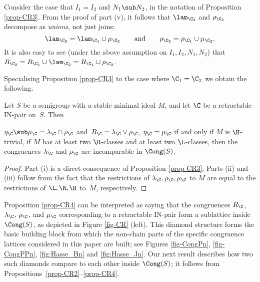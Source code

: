 \begin{rem}\label{rem:nonprincipal}
Consider the case that $I_1=I_2$ and $N_1\sub N_2$, in the notation of Proposition \ref{prop-CR3}.  From the proof of part (v), it follows that $\lam_{\C_2}$ and $\rho_{\C_2}$ decompose as \emph{unions}, not just joins:
\[
\lam_{\C_2} = \lam_{\C_1}\cup\mu_{\C_2} \qquad\text{and}\qquad \rho_{\C_2} = \rho_{\C_1}\cup\mu_{\C_2}.
\]
It is also easy to see (under the above assumption on $I_1,I_2,N_1,N_2$) that $R_{\C_2}=R_{\C_1}\cup\lam_{\C_2}=R_{\C_1}\cup\rho_{\C_2}$.
\end{rem}

Specialising Proposition \ref{prop-CR3} to the case where $\C_1=\C_2$ we obtain
the following.

\begin{proposition}
\label{prop-CR4}
Let $S$ be a semigroup with a stable minimal ideal $M$, and let $\C$ be a retractable IN-pair on~$S$.  Then 
\begin{itemize}
 $\eta_\C\sub\mu_\C=\lambda_{\C}\cap \rho_{\C}$ and~$R_\C=\lambda_{\C}\vee \rho_{\C}$,
 $\eta_\C=\mu_\C$ if and only if $M$ is $\H$-trivial,
 if $M$ has at least two $\R$-classes and at least two $\L$-classes, then the congruences $\lambda_{\C}$ and $\rho_{\C}$ are incomparable in $\Cong(S)$.
\end{itemize}
\end{proposition}

\begin{proof} Part (i) is a direct consequence of Proposition \ref{prop-CR3}.  Parts (ii) and (iii) follow from the fact that the restrictions of $\lambda_\C,\rho_\C,\mu_\C$ to $M$ are equal to the restrictions of $\L,\R,\H$ to~$M$, respectively. \end{proof}

Proposition \ref{prop-CR4} can be interpreted as saying that the congruences
$R_{\C}$, $\lambda_{\C}$, $\rho_{\C}$, and $\mu_{\C}$ corresponding to a
retractable IN-pair form a sublattice inside $\Cong(S)$, as
depicted in Figure \ref{fig-CR} (left).
This diamond structure forms the basic building block from which the
non-chain parts of the specific congruence lattices considered in this paper are
built; see Figures \ref{fig-CongPn}, \ref{fig-CongPPn}, \ref{fig:Hasse_Bn} and
\ref{fig:Hasse_Jn}. Our next result describes how two such diamonds compare to
each other inside $\Cong(S)$; it follows from Propositions~\ref{prop-CR2}--\ref{prop-CR4}.


